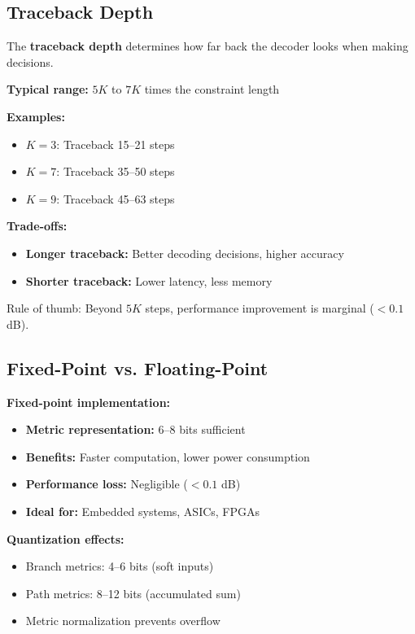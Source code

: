 \subsection{Traceback Depth}

The \textbf{traceback depth} determines how far back the decoder looks when making decisions.

\textbf{Typical range:} $5K$ to $7K$ times the constraint length

\textbf{Examples:}
\begin{itemize}
\item $K=3$: Traceback 15--21 steps
\item $K=7$: Traceback 35--50 steps
\item $K=9$: Traceback 45--63 steps
\end{itemize}

\textbf{Trade-offs:}
\begin{itemize}
\item \textbf{Longer traceback:} Better decoding decisions, higher accuracy
\item \textbf{Shorter traceback:} Lower latency, less memory
\end{itemize}

Rule of thumb: Beyond $5K$ steps, performance improvement is marginal ($< 0.1$ dB).

\subsection{Fixed-Point vs. Floating-Point}

\textbf{Fixed-point implementation:}
\begin{itemize}
\item \textbf{Metric representation:} 6--8 bits sufficient
\item \textbf{Benefits:} Faster computation, lower power consumption
\item \textbf{Performance loss:} Negligible ($< 0.1$ dB)
\item \textbf{Ideal for:} Embedded systems, ASICs, FPGAs
\end{itemize}

\textbf{Quantization effects:}
\begin{itemize}
\item Branch metrics: 4--6 bits (soft inputs)
\item Path metrics: 8--12 bits (accumulated sum)
\item Metric normalization prevents overflow
\end{itemize}

